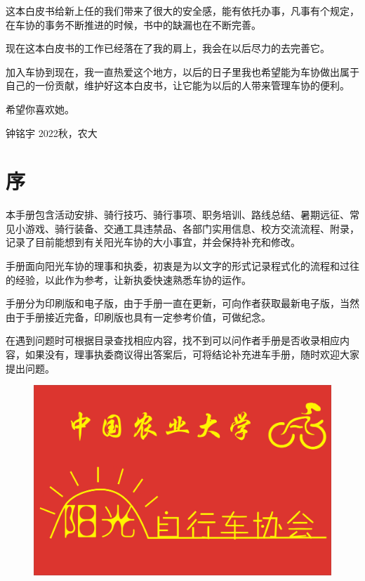 \documentclass{ctexbook}
\begin{document}
这本白皮书给新上任的我们带来了很大的安全感，能有依托办事，凡事有个规定，在车协的事务不断推进的时候，书中的缺漏也在不断完善。

现在这本白皮书的工作已经落在了我的肩上，我会在以后尽力的去完善它。

加入车协到现在，我一直热爱这个地方，以后的日子里我也希望能为车协做出属于自己的一份贡献，维护好这本白皮书，让它能为以后的人带来管理车协的便利。

希望你喜欢她。

\hfill 钟\hspace{3mm}铭\hspace{3mm}宇 \hspace{10mm}
\hfill 2022秋，农大 \hspace{2mm}


\chapter{序}
本手册包含活动安排、骑行技巧、骑行事项、职务培训、路线总结、暑期远征、常见小游戏、骑行装备、交通工具违禁品、各部门实用信息、校方交流流程、附录，记录了目前能想到有关阳光车协的大小事宜，并会保持补充和修改。

手册面向阳光车协的理事和执委，初衷是为以文字的形式记录程式化的流程和过往的经验，以此作为参考，让新执委快速熟悉车协的运作。

手册分为印刷版和电子版，由于手册一直在更新，可向作者获取最新电子版，当然由于手册接近完备，印刷版也具有一定参考价值，可做纪念。

在遇到问题时可根据目录查找相应内容，找不到可以问作者手册是否收录相应内容，如果没有，理事执委商议得出答案后，可将结论补充进车手册，随时欢迎大家提出问题。
\begin{figure}[H]
\centering
  \includegraphics[width=1\linewidth]{fig/会旗.jpg}
\end{figure}
\end{document}
